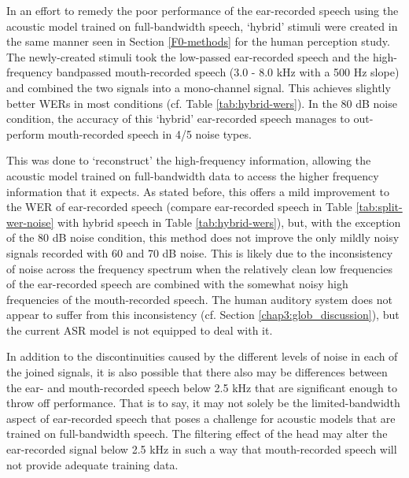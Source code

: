 
In an effort to remedy the poor performance of the ear-recorded speech using the acoustic model trained on full-bandwidth speech, `hybrid' stimuli were created in the same manner seen in Section \ref{F0-methods} for the human perception study.  The newly-created stimuli took the low-passed ear-recorded speech and the high-frequency bandpassed mouth-recorded speech (3.0 - 8.0 kHz with a 500 Hz slope) and combined the two signals into a mono-channel signal.  This achieves slightly better WERs in most conditions (cf. Table \ref{tab:hybrid-wers}).  In the 80 dB noise condition, the accuracy of this `hybrid' ear-recorded speech manages to out-perform mouth-recorded speech in 4/5 noise types.  

This was done to `reconstruct' the high-frequency information, allowing the acoustic model trained on full-bandwidth data to access the higher frequency information that it expects.  As stated before, this offers a mild improvement to the WER of ear-recorded speech (compare ear-recorded speech in Table \ref{tab:split-wer-noise} with hybrid speech in Table \ref{tab:hybrid-wers}), but, with the exception of the 80 dB noise condition, this method does not improve the only mildly noisy signals recorded with 60 and 70 dB noise.  This is likely due to the inconsistency of noise across the frequency spectrum when the relatively clean low frequencies of the ear-recorded speech are combined with the somewhat noisy high frequencies of the mouth-recorded speech.  The human auditory system does not appear to suffer from this inconsistency (cf. Section \ref{chap3:glob_discussion}), but the current ASR model is not equipped to deal with it.

In addition to the discontinuities caused by the different levels of noise in each of the joined signals, it is also possible that there also may be differences between the ear- and mouth-recorded speech below 2.5 kHz that are significant enough to throw off performance.  That is to say, it may not solely be the limited-bandwidth aspect of ear-recorded speech that poses a challenge for acoustic models that are trained on full-bandwidth speech.  The filtering effect of the head may alter the ear-recorded signal below 2.5 kHz in such a way that mouth-recorded speech will not provide adequate training data.


